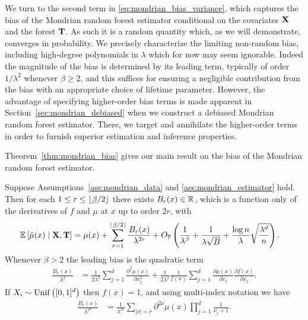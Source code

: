 We turn to the second term in \eqref{eq:mondrian_bias_variance}, which captures
the bias
of the Mondrian random forest estimator conditional on the covariates $\mathbf{X}$ and
the forest $\mathbf{T}$. As such it is a random quantity which, as we will
demonstrate, converges in probability. We precisely characterize the limiting
non-random bias, including high-degree polynomials in $\lambda$ which for now
may seem ignorable. Indeed the magnitude of the bias is determined by its
leading term, typically of order $1/\lambda^2$ whenever $\beta \geq 2$, and
this suffices for ensuring a negligible contribution from the bias with an
appropriate choice of lifetime parameter. However, the advantage of specifying
higher-order bias terms is made apparent in Section~\ref{sec:mondrian_debiased}
when we
construct a debiased Mondrian random forest estimator. There, we target and
annihilate the higher-order terms in order to furnish superior estimation and
inference properties.

Theorem~\ref{thm:mondrian_bias} gives our main result on
the bias of the Mondrian random forest estimator.

\begin{theorem}%
  \label{thm:mondrian_bias}
  Suppose Assumptions~\ref{ass:mondrian_data} and \ref{ass:mondrian_estimator}
  hold.
  Then for each $1 \leq r \leq \lfloor \flbeta / 2 \rfloor$ there exists
  $B_r(x) \in \mathbb{R}$, which is a function only of
  the derivatives of $f$ and $\mu$ at $x$ up to order $2r$, with
  \begin{align*}
    \E \left[ \hat \mu(x) \mid \bX, \bT \right]
    &=
    \mu(x)
    + \sum_{r=1}^{\lfloor \flbeta / 2 \rfloor}
    \frac{B_r(x)}{\lambda^{2r}}
    + O_\P \left(
      \frac{1}{\lambda^\beta}
      + \frac{1}{\lambda \sqrt B}
      + \frac{\log n}{\lambda} \sqrt{\frac{\lambda^d}{n}}
    \right).
  \end{align*}
  Whenever $\beta > 2$ the leading bias is the quadratic term
  \begin{align*}
    \frac{B_1(x)}{\lambda^2}
    &=
    \frac{1}{2 \lambda^2}
    \sum_{j=1}^d \frac{\partial^2 \mu(x)}{\partial x_j^2}
    + \frac{1}{2 \lambda^2}
    \frac{1}{f(x)}
    \sum_{j=1}^{d} \frac{\partial \mu(x)}{\partial x_j}
    \frac{\partial f(x)}{\partial x_j}.
  \end{align*}
  If $X_i \sim \operatorname{Unif}\big([0,1]^d\big)$ then $f(x) = 1$,
  and using multi-index notation we have
  \begin{align*}
    \frac{B_r(x)}{\lambda^{2r}}
    &=
    \frac{1}{\lambda^{2r}} \sum_{|\nu|=r} \partial^{2 \nu} \mu(x)
    \prod_{j=1}^d \frac{1}{\nu_j + 1}.
  \end{align*}
\end{theorem}

